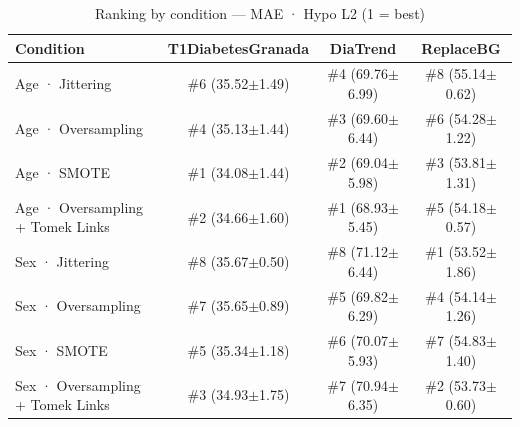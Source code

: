 \begin{table}[htbp]
\centering
\small
\caption{Ranking by condition — MAE · Hypo L2  (1 = best)}
\label{tab:ranking_mae_tbr_2_family_size_oversampling}
\begin{tabular}{lccc}
\toprule
\textbf{Condition} & \textbf{T1DiabetesGranada} & \textbf{DiaTrend} & \textbf{ReplaceBG} \\
\midrule
Age · Jittering & \#6 (35.52$\pm$1.49) & \#4 (69.76$\pm$6.99) & \#8 (55.14$\pm$0.62) \\
Age · Oversampling & \#4 (35.13$\pm$1.44) & \#3 (69.60$\pm$6.44) & \#6 (54.28$\pm$1.22) \\
Age · SMOTE & \#1 (34.08$\pm$1.44) & \#2 (69.04$\pm$5.98) & \#3 (53.81$\pm$1.31) \\
Age · Oversampling + Tomek Links & \#2 (34.66$\pm$1.60) & \#1 (68.93$\pm$5.45) & \#5 (54.18$\pm$0.57) \\
\midrule
Sex · Jittering & \#8 (35.67$\pm$0.50) & \#8 (71.12$\pm$6.44) & \#1 (53.52$\pm$1.86) \\
Sex · Oversampling & \#7 (35.65$\pm$0.89) & \#5 (69.82$\pm$6.29) & \#4 (54.14$\pm$1.26) \\
Sex · SMOTE & \#5 (35.34$\pm$1.18) & \#6 (70.07$\pm$5.93) & \#7 (54.83$\pm$1.40) \\
Sex · Oversampling + Tomek Links & \#3 (34.93$\pm$1.75) & \#7 (70.94$\pm$6.35) & \#2 (53.73$\pm$0.60) \\
\bottomrule
\end{tabular}
\end{table}